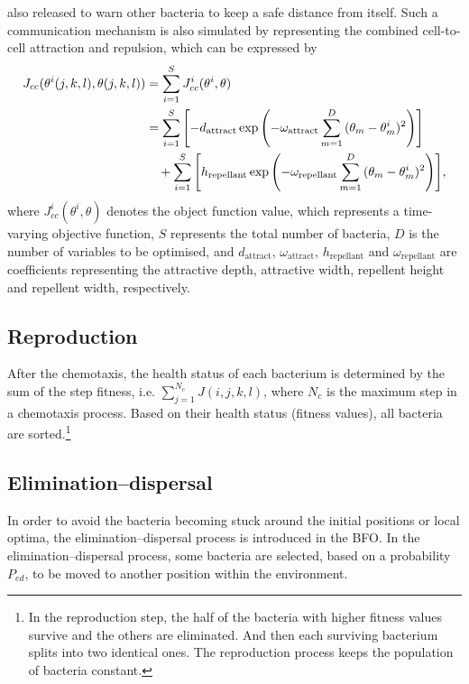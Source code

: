\documentclass{PDS}%
\theoremstyle{definition}
\begin{document}
also released to warn other bacteria to keep a safe distance from itself. Such a
communication mechanism is also simulated by representing the combined cell-to-cell
attraction and repulsion, which can be expressed by
\begin{align}
J_{cc} (\theta^i(j, k, l) ,\theta(j, k, l)) &= \sum_{i = 1}^S {J_{cc}^i (\theta^i,\theta)}\notag\\
&= \sum_{i = 1}^S {\left[ - d_{\text{attract}} \exp \left( - \omega_{\text{attract}} \sum_{m =
1}^D {(\theta_m - \theta_m^i )^2 } \right)\right]}\notag\\
&\quad +\sum_{i = 1}^S {\left[h_{\text{repellant}} \exp \left( - \omega_{\text{repellant}} \sum_{m =
1}^D {(\theta_m - \theta_m^i )^2 } \right)\right]},
\label{equ:2}
\end{align}
where $J_{cc}^i (\theta^i ,\theta)$ denotes the object function value, which represents a
time-varying objective function, $S$ represents the total number of bacteria, $D$ is the
number of variables to be optimised, and $d_{\text{attract}}$, $\omega_{\text{attract}}$,
$h_{\text{repellant}}$ and $\omega_{\text{repellant}}$ are coefficients representing the
attractive depth, attractive width, repellent height and repellent width, respectively.

\subsection{Reproduction}

After the chemotaxis, the health status of each bacterium is determined by the sum of the
step fitness, i.e. $\sum_{j=1}^{N_c}J(i,j,k,l)$, where $N_c$ is the maximum step in a
chemotaxis process. Based on their health status (fitness values), all bacteria are
sorted.\footnote{In the reproduction step, the half of the bacteria with higher fitness values survive
and the others are eliminated. And then each surviving bacterium splits into two
identical ones. The reproduction process keeps the population of
bacteria constant.}

\subsection{Elimination--dispersal}

In order to avoid the bacteria becoming stuck around the initial positions or local
optima, the elimination--dispersal process is introduced in the BFO. In the
elimination--dispersal process, some bacteria are selected, based on a probability
$P_{ed}$, to be moved to another position within the environment.
\end{document}

